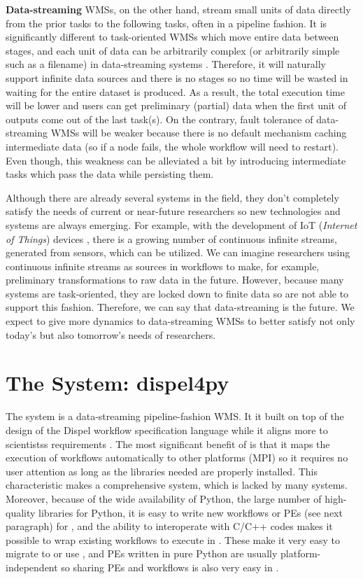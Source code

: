\textbf{Data-streaming} WMSs, on the other hand, stream small units of data directly from the prior tasks to the following tasks, often in a pipeline fashion. It is significantly different to task-oriented WMSs which move entire data between stages, and each unit of data can be arbitrarily complex (or arbitrarily simple such as a filename) in data-streaming systems \cite{doi:10.1177/1094342016649766}. Therefore, it will naturally support infinite data sources and there is no stages so no time will be wasted in waiting for the entire dataset is produced. As a result, the total execution time will be lower and users can get preliminary (partial) data when the first unit of outputs come out of the last task(s). On the contrary, fault tolerance of data-streaming WMSs will be weaker because there is no default mechanism caching intermediate data (so if a node fails, the whole workflow will need to restart). Even though, this weakness can be alleviated a bit by introducing intermediate tasks which pass the data while persisting them.

Although there are already several systems in the field, they don't completely satisfy the needs of current or near-future researchers so new technologies and systems are always emerging. For example, with the development of IoT (\emph{Internet of Things}) devices \cite{GUBBI20131645}, there is a growing number of continuous infinite streams, \eg generated from sensors, which can be utilized. We can imagine researchers using continuous infinite streams as sources in workflows to make, for example, preliminary transformations to raw data in the future. However, because many systems are task-oriented, they are locked down to finite data so are not able to support this fashion. Therefore, we can say that data-streaming is the future. We expect to give more dynamics to data-streaming WMSs to better satisfy not only today's but also tomorrow's needs of researchers.

\section{The System: dispel4py}
The \dpy system is a data-streaming pipeline-fashion WMS. It it built on top of the design of the Dispel workflow specification language \cite{atkinson2012data} while it aligns more to scientistss requirements \cite{doi:10.1177/1094342016649766}. The most significant benefit of \dpy is that it maps the execution of workflows automatically to other platforms (\eg MPI) so it requires no user attention as long as the libraries needed are properly installed. This characteristic makes \dpy a comprehensive system, which is lacked by many systems. Moreover, because of the wide availability of Python, the large number of high-quality libraries for Python, it is easy to write new workflows or PEs (see next paragraph) for \dpy, and the ability to interoperate with C/C++ codes makes it possible to wrap existing workflows to execute in \dpy. These make it very easy to migrate to or use \dpy, and  PEs written in pure Python are usually platform-independent so sharing PEs and workflows is also very easy in \dpy.

